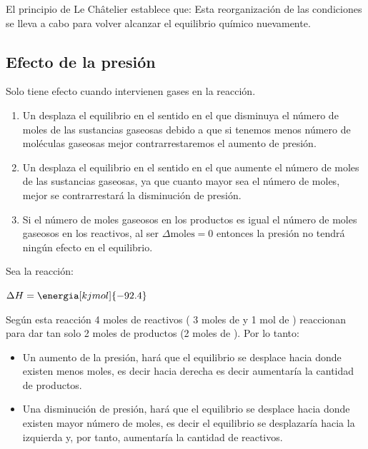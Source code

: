     El principio de Le Châtelier establece que:
    Esta reorganización de las condiciones se lleva a cabo para volver alcanzar el equilibrio químico nuevamente.

    \subsection{Efecto de la presión}\label{subsec:efecto-de-la-presion}

    Solo tiene efecto cuando intervienen gases en la reacción.
    \begin{enumerate}[label=\numberballmDarkTeal]
        \item Un  desplaza el equilibrio en el sentido en el que disminuya el número de moles de las sustancias gaseosas debido a que si tenemos menos número de moléculas gaseosas mejor contrarrestaremos el aumento de presión.
        \item Un  desplaza el equilibrio en el sentido en el que aumente el número de moles de las sustancias gaseosas, ya que cuanto mayor sea el número de moles, mejor se contrarrestará la disminución de presión.
        \item Si el número de moles gaseosos en los productos es igual el número de moles gaseosos en los reactivos, al ser \(\Delta \text{moles} = 0\) entonces la presión no tendrá ningún efecto en el equilibrio.
    \end{enumerate}
    \begin{example}
        Sea la reacción:
        \begin{center}
            \hspace{12pt} $\Delta H = \energia[kjmol]{-92.4}$
        \end{center}
        Según esta reacción 4 moles de reactivos ( 3 moles de  y 1 mol de ) reaccionan para dar tan solo 2 moles de productos (2 moles de ). Por lo tanto:
        \begin{itemize}
            \item Un aumento de la presión, hará que el equilibrio se desplace hacia donde existen menos moles, es decir hacia derecha es decir aumentaría la cantidad de productos.
            \item Una disminución de presión, hará que el equilibrio se desplace hacia donde existen mayor número de moles, es decir el equilibrio se desplazaría hacia la izquierda y, por tanto, aumentaría la cantidad de reactivos.
        \end{itemize}
    \end{example}

